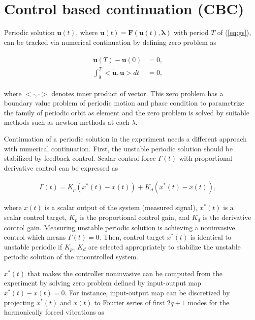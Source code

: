 \documentclass[openacc]{rsproca_new}%
\def\vec#1{\ensuremath{\mathbf{#1}}}
\newcommand{\Eref}[1]{(\ref{#1})}
\begin{document}
\section{Control based continuation (CBC)}\label{CBC}

Periodic solution $\vec{u}(t)$, where $\dot{\vec{u}}(t) =\vec{F}(\vec{u}(t),\vec{\lambda})$ with period $T$ of \Eref{eq:gs}, can be tracked via numerical continuation by defining zero problem as

\begin{align}\label{eq:zp2}
  \begin{split}
 \vec{u}(T)-\vec{u}(0)&=0,\\
   \int_{0}^{T} <\dot {\vec{u}}, \vec{u}> dt&=0,
\end{split}
\end{align}

\noindent where $<\cdot,\cdot>$ denotes inner product of vector. This zero problem has a boundary value problem of periodic motion and phase condition to parametrize the family of periodic orbit as element and the zero problem is solved by suitable methods such as newton methods at each $\lambda$.


Continuation of a periodic solution in the experiment needs a different approach with numerical continuation. First, the unstable periodic solution should be stabilized by feedback control. Scalar control force $\Gamma(t)$ with proportional derivative control can be expressed as

\begin{align}
  \Gamma(t)=K_p(x^*(t)-x(t))+K_d(\dot x^*(t)-\dot x(t)),
\end{align}

\noindent where $x(t)$ is a scalar output of the system (measured signal), $x^*(t)$ is a scalar control target, $K_p$ is the proportional control gain, and $K_d$ is the derivative control gain. Measuring unstable periodic solution is achieving a noninvasive control which means $\Gamma(t)=0$. Then, control target $x^*(t)$ is identical to unstable periodic if $K_p$, $K_d$ are selected appropriately to stabilize the unstable periodic solution of the uncontrolled system.

$x^*(t)$ that makes the controller noninvasive can be computed from the experiment by solving zero problem defined by input-output map $x^*(t)-x(t)=0$. For instance, input-output map can be discretized by projecting $x^*(t)$ and $x(t)$ to Fourier series of first $2q+1$ modes for the harmonically forced vibrations as
\end{document}
